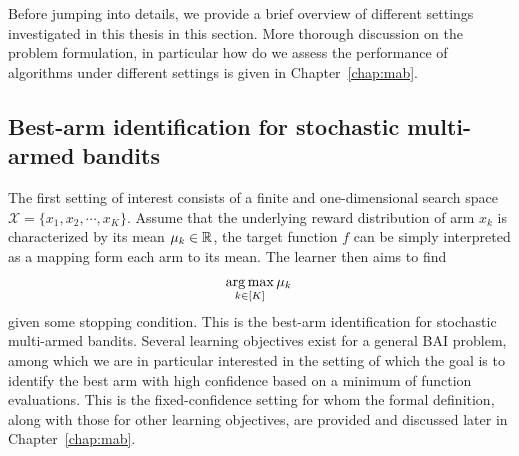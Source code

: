Before jumping into details, we provide a brief overview of different settings investigated in this thesis in this section. More thorough discussion on the problem formulation, in particular how do we assess the performance of algorithms under different settings is given in Chapter~\ref{chap:mab}.



\subsection{Best-arm identification for stochastic multi-armed bandits}\label{sec:intro.mab.bai}

The first setting of interest consists of a finite and one-dimensional search space $\mathcal{X} = \{x_1,x_2,\cdots,x_K\}$. Assume that the underlying reward distribution of arm $x_k$ is characterized by its mean $\mu_k\in\mathbb{R}$, the target function $f$ can be simply interpreted as a mapping form each arm to its mean. The learner then aims to find
\begin{align}\label{eq:optim_bai}
    \operatorname*{arg\,max}_{k\in[K]} \mu_k\,
\end{align}
given some stopping condition. This is the best-arm identification for stochastic multi-armed bandits. Several learning objectives exist for a general BAI problem, among which we are in particular interested in the setting of which the goal is to identify the best arm with high confidence based on a minimum of function evaluations. This is the \gls{fixed-confidence setting} for whom the formal definition, along with those for other learning objectives, are provided and discussed later in Chapter~\ref{chap:mab}.

